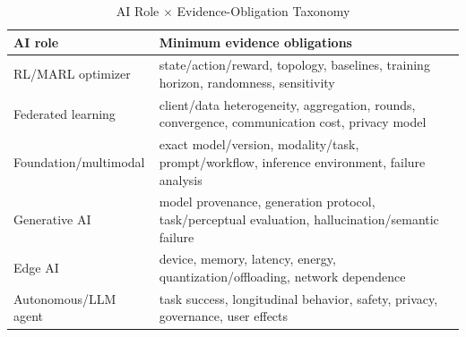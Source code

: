 \begin{table}[H]\centering\caption{AI Role $\times$ Evidence-Obligation Taxonomy}\label{tab:aiobligations}\scriptsize\begin{tabularx}{\columnwidth}{p{}Y}\toprule AI role & Minimum evidence obligations\\\midrule RL/MARL optimizer & state/action/reward, topology, baselines, training horizon, randomness, sensitivity\\ Federated learning & client/data heterogeneity, aggregation, rounds, convergence, communication cost, privacy model\\ Foundation/multimodal & exact model/version, modality/task, prompt/workflow, inference environment, failure analysis\\ Generative AI & model provenance, generation protocol, task/perceptual evaluation, hallucination/semantic failure\\ Edge AI & device, memory, latency, energy, quantization/offloading, network dependence\\ Autonomous/LLM agent & task success, longitudinal behavior, safety, privacy, governance, user effects\\\bottomrule\end{tabularx}\end{table}